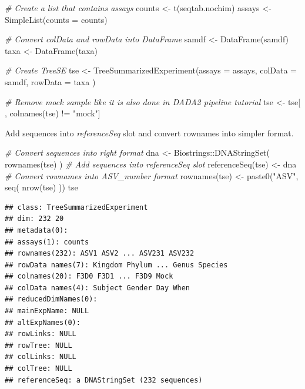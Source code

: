 \documentclass[
]{book}
\newenvironment{Shaded}{\begin{snugshade}}{\end{snugshade}}
\newcommand{\AttributeTok}[1]{\textcolor[rgb]{0.77,0.63,0.00}{#1}}
\newcommand{\CommentTok}[1]{\textcolor[rgb]{0.56,0.35,0.01}{\textit{#1}}}
\newcommand{\FunctionTok}[1]{\textcolor[rgb]{0.00,0.00,0.00}{#1}}
\newcommand{\NormalTok}[1]{#1}
\newcommand{\OtherTok}[1]{\textcolor[rgb]{0.56,0.35,0.01}{#1}}
\newcommand{\SpecialCharTok}[1]{\textcolor[rgb]{0.00,0.00,0.00}{#1}}
\newcommand{\StringTok}[1]{\textcolor[rgb]{0.31,0.60,0.02}{#1}}
\begin{document}
\begin{Shaded}
\begin{Highlighting}[]
\CommentTok{\# Create a list that contains assays}
\NormalTok{counts }\OtherTok{\textless{}{-}} \FunctionTok{t}\NormalTok{(seqtab.nochim)}
\NormalTok{assays }\OtherTok{\textless{}{-}} \FunctionTok{SimpleList}\NormalTok{(}\AttributeTok{counts =}\NormalTok{ counts)}

\CommentTok{\# Convert colData and rowData into DataFrame}
\NormalTok{samdf }\OtherTok{\textless{}{-}} \FunctionTok{DataFrame}\NormalTok{(samdf)}
\NormalTok{taxa }\OtherTok{\textless{}{-}} \FunctionTok{DataFrame}\NormalTok{(taxa)}

\CommentTok{\# Create TreeSE}
\NormalTok{tse }\OtherTok{\textless{}{-}} \FunctionTok{TreeSummarizedExperiment}\NormalTok{(}\AttributeTok{assays =}\NormalTok{ assays,}
                                \AttributeTok{colData =}\NormalTok{ samdf,}
                                \AttributeTok{rowData =}\NormalTok{ taxa}
\NormalTok{                                )}

\CommentTok{\# Remove mock sample like it is also done in DADA2 pipeline tutorial}
\NormalTok{tse }\OtherTok{\textless{}{-}}\NormalTok{ tse[ , }\FunctionTok{colnames}\NormalTok{(tse) }\SpecialCharTok{!=} \StringTok{"mock"}\NormalTok{]}
\end{Highlighting}
\end{Shaded}

Add sequences into \emph{referenceSeq} slot and convert rownames into simpler format.

\begin{Shaded}
\begin{Highlighting}[]
\CommentTok{\# Convert sequences into right format}
\NormalTok{dna }\OtherTok{\textless{}{-}}\NormalTok{ Biostrings}\SpecialCharTok{::}\FunctionTok{DNAStringSet}\NormalTok{( }\FunctionTok{rownames}\NormalTok{(tse) )}
\CommentTok{\# Add sequences into referenceSeq slot}
\FunctionTok{referenceSeq}\NormalTok{(tse) }\OtherTok{\textless{}{-}}\NormalTok{ dna}
\CommentTok{\# Convert rownames into ASV\_number format}
\FunctionTok{rownames}\NormalTok{(tse) }\OtherTok{\textless{}{-}} \FunctionTok{paste0}\NormalTok{(}\StringTok{"ASV"}\NormalTok{, }\FunctionTok{seq}\NormalTok{( }\FunctionTok{nrow}\NormalTok{(tse) ))}
\NormalTok{tse}
\end{Highlighting}
\end{Shaded}

\begin{verbatim}
## class: TreeSummarizedExperiment 
## dim: 232 20 
## metadata(0):
## assays(1): counts
## rownames(232): ASV1 ASV2 ... ASV231 ASV232
## rowData names(7): Kingdom Phylum ... Genus Species
## colnames(20): F3D0 F3D1 ... F3D9 Mock
## colData names(4): Subject Gender Day When
## reducedDimNames(0):
## mainExpName: NULL
## altExpNames(0):
## rowLinks: NULL
## rowTree: NULL
## colLinks: NULL
## colTree: NULL
## referenceSeq: a DNAStringSet (232 sequences)
\end{verbatim}
\end{document}
